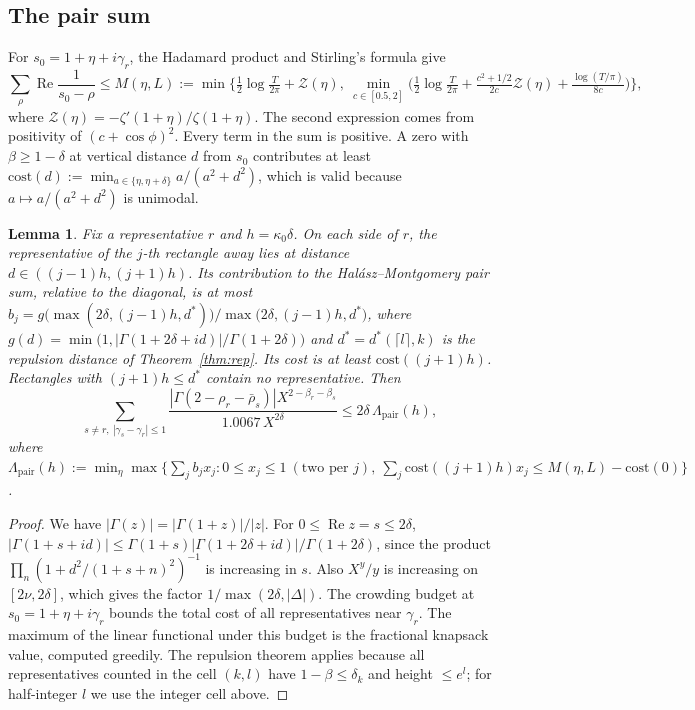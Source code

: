 \documentclass[11pt]{amsart}
\numberwithin{equation}{section}
\newtheorem{lemma}[theorem]{Lemma}
\theoremstyle{definition}
\theoremstyle{remark}
\newcommand{\Rp}{\operatorname{Re}}
\begin{document}
\subsection{The pair sum}
For $s_0 = 1 + \eta + i\gamma_r$, the Hadamard product and Stirling's formula give
\[
\sum_\rho\Rp\frac{1}{s_0-\rho} \le M(\eta, L) := \min\Big\{\tfrac12\log\tfrac{T}{2\pi} + \mathcal Z(\eta),\ \min_{c\in[0.5,2]}\Big(\tfrac12\log\tfrac T{2\pi} + \tfrac{c^2+1/2}{2c}\mathcal Z(\eta) + \tfrac{\log(T/\pi)}{8c}\Big)\Big\},
\]
where $\mathcal Z(\eta) = -\zeta'(1+\eta)/\zeta(1+\eta)$.
The second expression comes from positivity of $(c + \cos\phi)^2$.
Every term in the sum is positive.
A zero with $\beta \ge 1-\delta$ at vertical distance $d$ from $s_0$ contributes at least
$\mathrm{cost}(d) := \min_{a\in\{\eta, \eta+\delta\}} a/(a^2+d^2)$,
which is valid because $a\mapsto a/(a^2+d^2)$ is unimodal.

\begin{lemma}\label{lem:pair}
Fix a representative $r$ and $h = \kappa_0\delta$.
On each side of $r$, the representative of the $j$-th rectangle away lies at distance $d \in ((j-1)h, (j+1)h)$.
Its contribution to the Hal\'asz--Montgomery pair sum, relative to the diagonal, is at most
$b_j = g\big(\max(2\delta, (j-1)h, d^*)\big)/\max\big(2\delta, (j-1)h, d^*\big)$, where
$g(d) = \min\big(1, |\Gamma(1+2\delta+id)|/\Gamma(1+2\delta)\big)$ and $d^* = d^*(\lceil l\rceil, k)$ is the repulsion distance of Theorem~\ref{thm:rep}.
Its cost is at least $\mathrm{cost}((j+1)h)$.
Rectangles with $(j+1)h \le d^*$ contain no representative.
Then
\[
\sum_{s\ne r,\ |\gamma_s - \gamma_r| \le 1}\frac{|\Gamma(2-\rho_r-\bar\rho_s)|X^{2-\beta_r-\beta_s}}{1.0067\,X^{2\delta}} \le 2\delta\,\Lambda_{\mathrm{pair}}(h),
\]
where $\Lambda_{\mathrm{pair}}(h) := \min_\eta\max\big\{\sum_j b_jx_j : 0\le x_j\le 1 \ (\text{two per } j),\ \sum_j\mathrm{cost}((j+1)h)x_j \le M(\eta,L) - \mathrm{cost}(0)\big\}$.
\end{lemma}

\begin{proof}
We have $|\Gamma(z)| = |\Gamma(1+z)|/|z|$.
For $0\le\Rp z = s\le2\delta$, $|\Gamma(1+s+id)| \le \Gamma(1+s)|\Gamma(1+2\delta+id)|/\Gamma(1+2\delta)$, since the product $\prod_n(1+d^2/(1+s+n)^2)^{-1}$ is increasing in $s$.
Also $X^y/y$ is increasing on $[2\nu, 2\delta]$, which gives the factor $1/\max(2\delta, |\Delta|)$.
The crowding budget at $s_0 = 1+\eta+i\gamma_r$ bounds the total cost of all representatives near $\gamma_r$.
The maximum of the linear functional under this budget is the fractional knapsack value, computed greedily.
The repulsion theorem applies because all representatives counted in the cell $(k,l)$ have $1-\beta\le\delta_k$ and height $\le e^l$; for half-integer $l$ we use the integer cell above.
\end{proof}
\end{document}
